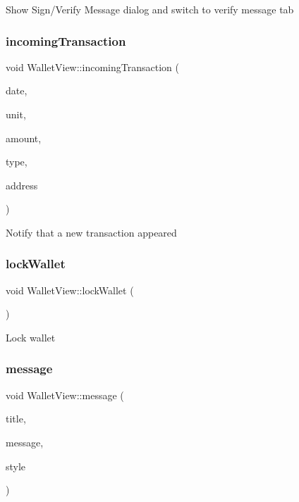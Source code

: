 Show Sign/\+Verify Message dialog and switch to verify message tab \mbox{\label{class_wallet_view_aa2348613d312c4c762d3e8100bd38067}} 
\subsubsection{\texorpdfstring{incoming\+Transaction}{incomingTransaction}}
{\footnotesize\ttfamily void Wallet\+View\+::incoming\+Transaction (\begin{DoxyParamCaption}\item[{const Q\+String \&}]{date,  }\item[{int}]{unit,  }\item[{const C\+Amount \&}]{amount,  }\item[{const Q\+String \&}]{type,  }\item[{const Q\+String \&}]{address }\end{DoxyParamCaption})\hspace{0.3cm}{\ttfamily [signal]}}

Notify that a new transaction appeared \mbox{\label{class_wallet_view_ae76bd29c36d1cfa9bc986924a0454eeb}} 
\subsubsection{\texorpdfstring{lock\+Wallet}{lockWallet}}
{\footnotesize\ttfamily void Wallet\+View\+::lock\+Wallet (\begin{DoxyParamCaption}{ }\end{DoxyParamCaption})\hspace{0.3cm}{\ttfamily [slot]}}

Lock wallet \mbox{\label{class_wallet_view_a901527bc1086ef5443a264af651de178}} 
\subsubsection{\texorpdfstring{message}{message}}
{\footnotesize\ttfamily void Wallet\+View\+::message (\begin{DoxyParamCaption}\item[{const Q\+String \&}]{title,  }\item[{const Q\+String \&}]{message,  }\item[{unsigned int}]{style }\end{DoxyParamCaption})\hspace{0.3cm}{\ttfamily [signal]}}

